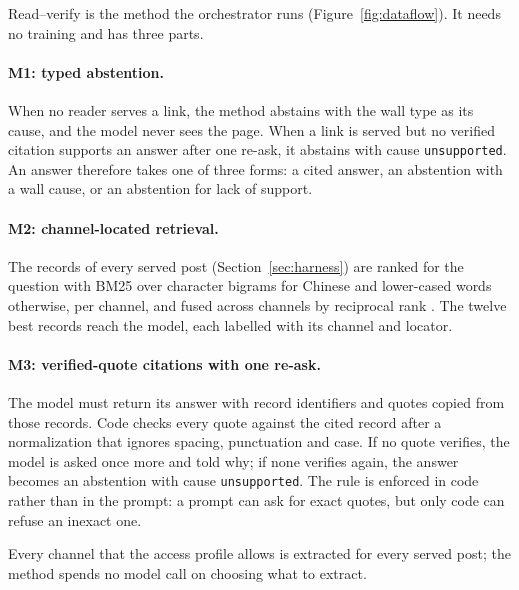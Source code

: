 Read--verify is the method the orchestrator runs (Figure~\ref{fig:dataflow}). It needs no training and has three
parts.

\paragraph{M1: typed abstention.}
When no reader serves a link, the method abstains with the wall type as its cause, and the model never sees the
page. When a link is served but no verified citation supports an answer after one re-ask, it abstains with cause
\texttt{unsupported}. An answer therefore takes one of three forms: a cited answer, an abstention with a wall
cause, or an abstention for lack of support.

\paragraph{M2: channel-located retrieval.}
The records of every served post (Section~\ref{sec:harness}) are ranked for the question with BM25 over
character bigrams for Chinese and lower-cased words otherwise, per channel, and fused across channels by
reciprocal rank \citep{samuel2025mmmorrf}. The twelve best records reach the model, each labelled with its
channel and locator.

\paragraph{M3: verified-quote citations with one re-ask.}
The model must return its answer with record identifiers and quotes copied from those records. Code checks every
quote against the cited record after a normalization that ignores spacing, punctuation and case. If no quote
verifies, the model is asked once more and told why; if none verifies again, the answer becomes an abstention
with cause \texttt{unsupported}. The rule is enforced in code rather than in the prompt: a prompt can ask for exact
quotes, but only code can refuse an inexact one.

Every channel that the access profile allows is extracted for every served post; the method spends no model call
on choosing what to extract.
